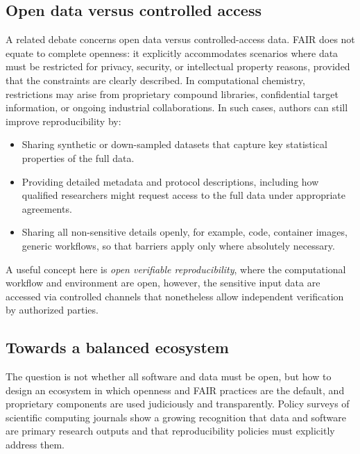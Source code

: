 \documentclass[12pt]{article}
\begin{document}
\subsection{Open data versus controlled access}

A related debate concerns open data versus controlled-access data. FAIR does not equate to complete openness: it explicitly accommodates scenarios where data must be restricted for privacy, security, or intellectual property reasons, provided that the constraints are clearly described.\cite{CH12_goFairPrinciples,CH12_nnlmFAIR}  In computational chemistry, restrictions may arise from proprietary compound libraries, confidential target information, or ongoing industrial collaborations. In such cases, authors can still improve reproducibility by:

\begin{itemize}
  \item Sharing synthetic or down-sampled datasets that capture key statistical properties of the full data.
  \item Providing detailed metadata and protocol descriptions, including how qualified researchers might request access to the full data under appropriate agreements.
  \item Sharing all non-sensitive details openly, for example, code, container images, generic workflows, so that barriers apply only where absolutely necessary.
\end{itemize}

A useful concept here is \emph{open verifiable reproducibility}, where the computational workflow and environment are open, however, the sensitive input data are accessed via controlled channels that nonetheless allow independent verification by authorized parties.\cite{CH12_computationalReproGuide}

\subsection{Towards a balanced ecosystem}

The question is not whether all software and data must be open, but how to design an ecosystem in which openness and FAIR practices are the default, and proprietary components are used judiciously and transparently. Policy surveys of scientific computing journals show a growing recognition that data and software are primary research outputs and that reproducibility policies must explicitly address them.\cite{CH12_frontiersRepro2025,CH12_rigorRepro2020} 
\end{document}
